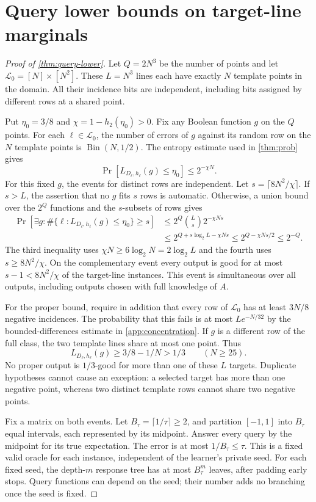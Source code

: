 \section{Query lower bounds on target-line marginals}\label{proof:query-lower}
\begin{proof}[Proof of \cref{thm:query-lower}]
Let $Q=2N^3$ be the number of points and let $\mathcal L_0=[N]\times[N^2]$. These $L=N^3$ lines each have exactly $N$ template points in the domain. All their incidence bits are independent, including bits assigned by different rows at a shared point.

Put $\eta_0=3/8$ and $\chi=1-h_2(\eta_0)>0$. Fix any Boolean function $g$ on the $Q$ points. For each $\ell\in\mathcal L_0$, the number of errors of $g$ against its random row on the $N$ template points is $\operatorname{Bin}(N,1/2)$. The entropy estimate used in \cref{thm:prob} gives
\[
 \Pr[L_{D_\ell,h_\ell}(g)\le\eta_0]
 \le 2^{-\chi N}.
\]
For this fixed $g$, the events for distinct rows are independent. Let $s=\lceil8N^2/\chi\rceil$. If $s>L$, the assertion that no $g$ fits $s$ rows is automatic. Otherwise, a union bound over the $2^Q$ functions and the $s$-subsets of rows gives
\begin{align*}
 \Pr[\exists g:\#\{\ell:L_{D_\ell,h_\ell}(g)\le\eta_0\}\ge s]
 &\le 2^Q\binom Ls2^{-\chi Ns}\\
 &\le 2^{Q+s\log_2L-\chi Ns}
 \le2^{Q-\chi Ns/2}
 \le2^{-Q}.
\end{align*}
The third inequality uses $\chi N\ge6\log_2N=2\log_2L$ and the fourth uses $s\ge8N^2/\chi$. On the complementary event every output is good for at most $s-1<8N^2/\chi$ of the target-line instances. This event is simultaneous over all outputs, including outputs chosen with full knowledge of $A$.

For the proper bound, require in addition that every row of $\mathcal L_0$ has at least $3N/8$ negative incidences. The probability that this fails is at most $L e^{-N/32}$ by the bounded-differences estimate in \cref{app:concentration}. If $g$ is a different row of the full class, the two template lines share at most one point. Thus
\[
 L_{D_\ell,h_\ell}(g)\ge3/8-1/N>1/3
 \qquad(N\ge25).
\]
No proper output is $1/3$-good for more than one of these $L$ targets. Duplicate hypotheses cannot cause an exception: a selected target has more than one negative point, whereas two distinct template rows cannot share two negative points.

Fix a matrix on both events. Let $B_\tau=\lceil1/\tau\rceil\ge2$, and partition $[-1,1]$ into $B_\tau$ equal intervals, each represented by its midpoint. Answer every query by the midpoint for its true expectation. The error is at most $1/B_\tau\le\tau$. This is a fixed valid oracle for each instance, independent of the learner's private seed. For each fixed seed, the depth-$m$ response tree has at most $B_\tau^m$ leaves, after padding early stops. Query functions can depend on the seed; their number adds no branching once the seed is fixed.


\end{proof}
